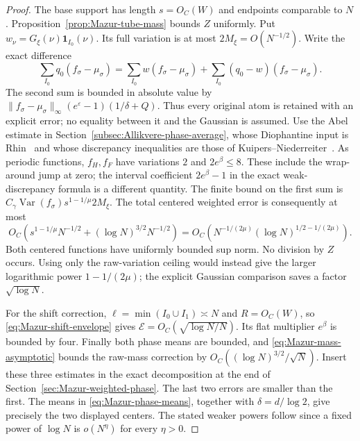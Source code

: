 \begin{proof}
The base support has length $s=O_C(W)$ and endpoints comparable to
$N$. Proposition~\ref{prop:Mazur-tube-mass} bounds $Z$ uniformly.
Put $w_\nu=G_\xi(\nu)\mathbf1_{I_0}(\nu)$. Its full variation
is at most $2M_\xi=O(N^{-1/2})$. Write the exact difference
\[
 \sum_{I_0}q_0(f_\sigma-\mu_\sigma)
 =\sum_{I_0}w(f_\sigma-\mu_\sigma)
       +\sum_{I_0}(q_0-w)(f_\sigma-\mu_\sigma).
\]
The second sum is bounded in absolute value by
$\|f_\sigma-\mu_\sigma\|_\infty(e^\varepsilon-1)(1/\delta+Q)$.
Thus every original atom is retained with an explicit error;
no equality between it and the Gaussian is assumed.
Use the Abel estimate in Section~\ref{subsec:Allikvere-phase-average}, whose Diophantine input is
Rhin~\cite[p.~160, (8)]{Rhin1987} and whose discrepancy inequalities
are those of Kuipers--Niederreiter~\cite[Ch.~2]{KN1974}.
As periodic functions, $f_H,f_F$ have variations $2$ and
$2e^\beta\le8$. These include the wrap-around jump at zero;
the interval coefficient $2e^\beta-1$ in the exact weak-discrepancy
formula is a different quantity. The finite bound on the first sum
is $C_\gamma\operatorname{Var}(f_\sigma)s^{1-1/\mu}2M_\xi$.
The total centered weighted error is consequently at most
\[
 O_C\!\left(s^{1-1/\mu}N^{-1/2}
                     +(\log N)^{3/2}N^{-1/2}\right)
 =O_C\!\left(N^{-1/(2\mu)}
                   (\log N)^{1/2-1/(2\mu)}\right).
\]
Both centered functions have uniformly bounded sup norm.
No division by $Z$ occurs. Using only the raw-variation ceiling
would instead give the larger logarithmic power $1-1/(2\mu)$;
the explicit Gaussian comparison saves a factor $\sqrt{\log N}$.

For the shift correction, $\ell=\min(I_0\cup I_1)\asymp N$ and
$R=O_C(W)$, so \eqref{eq:Mazur-shift-envelope} gives
$\mathcal E=O_C(\sqrt{\log N/N})$. Its flat multiplier $e^\beta$
is bounded by four. Finally both phase means are bounded, and
\eqref{eq:Mazur-mass-asymptotic} bounds the raw-mass correction
by $O_C((\log N)^{3/2}/\sqrt N)$.
Insert these three estimates in the exact decomposition at the end
of Section~\ref{sec:Mazur-weighted-phase}. The last two errors are
smaller than the first. The means in
\eqref{eq:Mazur-phase-means}, together with $\delta=d/\log2$,
give precisely the two displayed centers. The stated weaker powers
follow since a fixed power of $\log N$ is $o(N^\eta)$ for every
$\eta>0$.
\end{proof}

